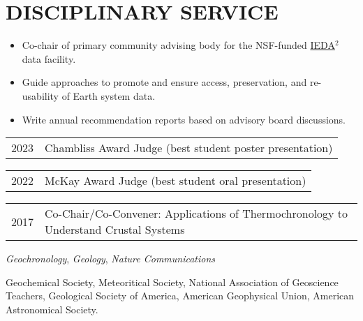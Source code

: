 \section{DISCIPLINARY SERVICE}

\begin{itemize}
	\item Co-chair of primary community advising body for the NSF-funded \href{https://www.iedadata.org/}{IEDA$^2$} data facility.
	\item Guide approaches to promote and ensure access, preservation, and re-usability of Earth system data.
	\item Write annual recommendation reports based on advisory board discussions. 
\end{itemize}



\begin{tabular}{ll} 
	2023 & Chambliss Award Judge (best student poster presentation)
\end{tabular}

\begin{tabular}{ll} 
	2022 & 	McKay Award Judge (best student oral presentation)
\end{tabular}

\begin{tabular}{ll} 
	2017 & 	Co-Chair/Co-Convener: Applications of Thermochronology to Understand Crustal Systems
\end{tabular}

\textit{Geochronology}, \textit{Geology}, \textit{Nature Communications}

Geochemical Society, Meteoritical Society, National Association of Geoscience Teachers, Geological Society of America, American Geophysical Union, American Astronomical Society.